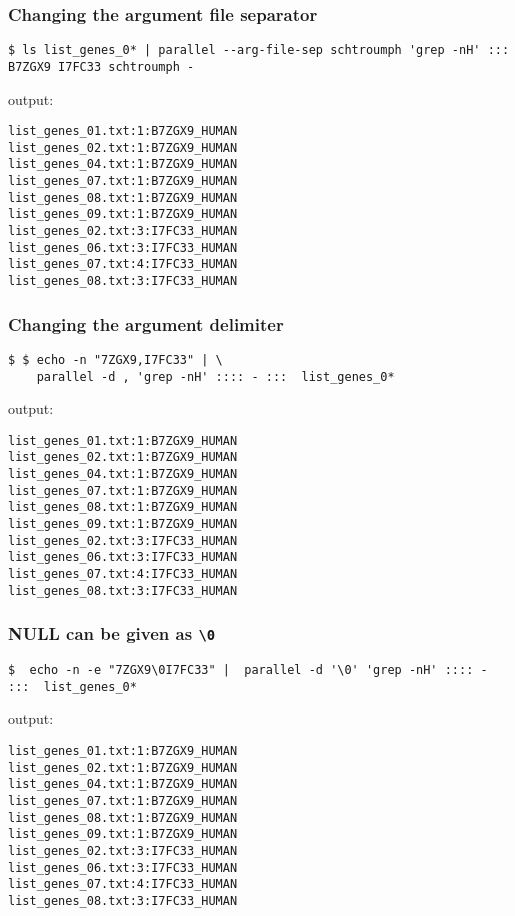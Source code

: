 \documentclass{article}
\begin{document}
\subsubsection{Changing the argument file separator}
\begin{lstlisting}
$ ls list_genes_0* | parallel --arg-file-sep schtroumph 'grep -nH' ::: B7ZGX9 I7FC33 schtroumph -
\end{lstlisting}
output:
\begin{lstlisting}
list_genes_01.txt:1:B7ZGX9_HUMAN
list_genes_02.txt:1:B7ZGX9_HUMAN
list_genes_04.txt:1:B7ZGX9_HUMAN
list_genes_07.txt:1:B7ZGX9_HUMAN
list_genes_08.txt:1:B7ZGX9_HUMAN
list_genes_09.txt:1:B7ZGX9_HUMAN
list_genes_02.txt:3:I7FC33_HUMAN
list_genes_06.txt:3:I7FC33_HUMAN
list_genes_07.txt:4:I7FC33_HUMAN
list_genes_08.txt:3:I7FC33_HUMAN
\end{lstlisting}
\subsubsection{Changing the argument delimiter}
\begin{lstlisting}
$ $ echo -n "7ZGX9,I7FC33" | \
	parallel -d , 'grep -nH' :::: - :::  list_genes_0*
\end{lstlisting}
output:
\begin{lstlisting}
list_genes_01.txt:1:B7ZGX9_HUMAN
list_genes_02.txt:1:B7ZGX9_HUMAN
list_genes_04.txt:1:B7ZGX9_HUMAN
list_genes_07.txt:1:B7ZGX9_HUMAN
list_genes_08.txt:1:B7ZGX9_HUMAN
list_genes_09.txt:1:B7ZGX9_HUMAN
list_genes_02.txt:3:I7FC33_HUMAN
list_genes_06.txt:3:I7FC33_HUMAN
list_genes_07.txt:4:I7FC33_HUMAN
list_genes_08.txt:3:I7FC33_HUMAN
\end{lstlisting}

\subsubsection{NULL can be given as  \texttt{\textbackslash{}0}}
\begin{lstlisting}
$  echo -n -e "7ZGX9\0I7FC33" |  parallel -d '\0' 'grep -nH' :::: - :::  list_genes_0*
\end{lstlisting}
output:
\begin{lstlisting}
list_genes_01.txt:1:B7ZGX9_HUMAN
list_genes_02.txt:1:B7ZGX9_HUMAN
list_genes_04.txt:1:B7ZGX9_HUMAN
list_genes_07.txt:1:B7ZGX9_HUMAN
list_genes_08.txt:1:B7ZGX9_HUMAN
list_genes_09.txt:1:B7ZGX9_HUMAN
list_genes_02.txt:3:I7FC33_HUMAN
list_genes_06.txt:3:I7FC33_HUMAN
list_genes_07.txt:4:I7FC33_HUMAN
list_genes_08.txt:3:I7FC33_HUMAN
\end{lstlisting}
\end{document}
